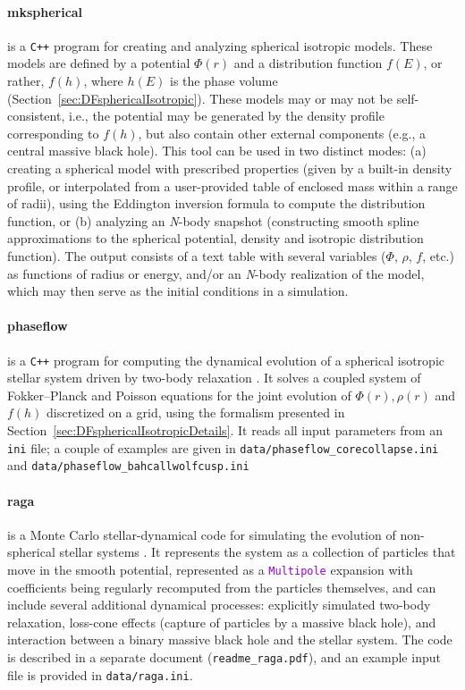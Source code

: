 \documentclass[12pt]{article}
\newcommand{\Nbody}{\textsl{N}-body\xspace}
\newcommand{\Cpp}  {\texttt{C++}\xspace}
\newcommand{\ttt}[1]{\textcolor{darkviolet}{\texttt{#1}}}
\begin{document}
\paragraph{mkspherical} is a \Cpp program for creating and analyzing spherical isotropic models. These models are defined by a potential $\Phi(r)$ and a distribution function $f(E)$, or rather, $f(h)$, where $h(E)$ is the phase volume (Section~\ref{sec:DFsphericalIsotropic}). These models may or may not be self-consistent, i.e., the potential may be generated by the density profile corresponding to $f(h)$, but also contain other external components (e.g., a central massive black hole). This tool can be used in two distinct modes: (a) creating a spherical model with prescribed properties (given by a built-in density profile, or interpolated from a user-provided table of enclosed mass within a range of radii), using the Eddington inversion formula to compute the distribution function, or (b) analyzing an \Nbody snapshot (constructing smooth spline approximations to the spherical potential, density and isotropic distribution function). The output consists of a text table with several variables ($\Phi$, $\rho$, $f$, etc.) as functions of radius or energy, and/or an \Nbody realization of the model, which may then serve as the initial conditions in a simulation.

\paragraph{phaseflow} is a \Cpp program for computing the dynamical evolution of a spherical isotropic stellar system driven by two-body relaxation \cite{Vasiliev2017}. It solves a coupled system of Fokker--Planck and Poisson equations for the joint evolution of $\Phi(r), \rho(r)$ and $f(h)$ discretized on a grid, using the formalism presented in Section~\ref{sec:DFsphericalIsotropicDetails}. It reads all input parameters from an \texttt{ini} file; a couple of examples are given in \texttt{data/phaseflow_corecollapse.ini} and \texttt{data/phaseflow_bahcallwolfcusp.ini}

\paragraph{raga} is a Monte Carlo stellar-dynamical code for simulating the evolution of non-spherical stellar systems \cite{Vasiliev2015}. It represents the system as a collection of particles that move in the smooth potential, represented as a \ttt{Multipole} expansion with coefficients being regularly recomputed from the particles themselves, and can include several additional dynamical processes: explicitly simulated two-body relaxation, loss-cone effects (capture of particles by a massive black hole), and interaction between a binary massive black hole and the stellar system. The code is described in a separate document (\texttt{readme_raga.pdf}), and an example input file is provided in \texttt{data/raga.ini}.
\end{document}
